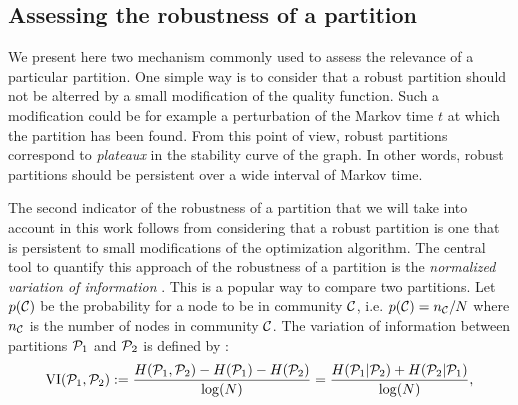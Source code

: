 \subsection{Assessing the robustness of a partition}
We present here two mechanism commonly used to assess the relevance of a particular partition. One simple way is to consider that a robust partition should not be alterred by a small modification of the quality function. Such a modification could be for example a perturbation of the Markov time $t$ at which the partition has been found. From this point of view, robust partitions correspond to \textit{plateaux} in the stability curve of the graph. In other words, robust partitions should be persistent over a wide interval of Markov time.

\begin{sloppypar} 
The second indicator of the robustness of a partition that we will take into account in this work follows from considering that a robust partition is one that is persistent to small modifications of the optimization algorithm. The central tool to quantify this approach of the robustness of a partition is the \textit{normalized variation of information} \cite{meilua2007comparing}. This is a popular way to compare two partitions. Let $p(\C)$ be the probability for a node to be in community $\C$, i.e. $p(\C) = n_\C/N$ where $n_\C$ is the number of nodes in community $\C$. The variation of information between partitions $\P_1$ and $\P_2$ is defined by :
\begin{equation} \label{eq:clustering_VI}
	\VI(\P_1,\P_2) := \frac{H(\P_1,\P_2)-H(\P_1)-H(\P_2)}{\log (N)} = \frac{H(\P_1|\P_2)+H(\P_2|\P_1)}{\log (N)},
\end{equation}

\end{sloppypar}
